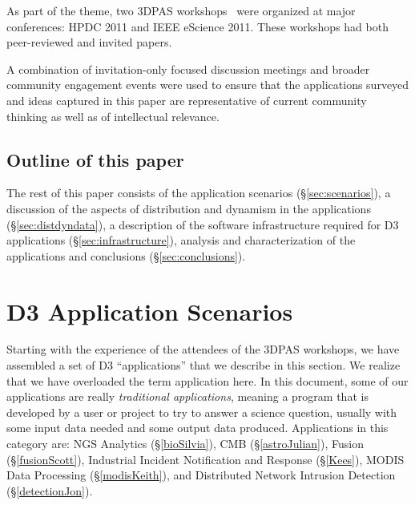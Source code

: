 As part of the theme, two 3DPAS workshops~\cite{3dapas,D3-escience}
were organized at major conferences: HPDC 2011 and IEEE eScience 2011.
These workshops had both peer-reviewed and invited papers.

A combination of invitation-only focused discussion meetings and
broader community engagement events were used to ensure that the
applications surveyed and ideas captured in this paper are
representative of current community thinking as well as of
intellectual relevance.


\subsection{Outline of this paper}

The rest of this paper consists of
the application scenarios (\S\ref{sec:scenarios}),
a discussion of the aspects of distribution and dynamism in the
applications (\S\ref{sec:distdyndata}),
a description of the software infrastructure required for D3 applications
(\S\ref{sec:infrastructure}),
analysis and characterization of the applications and
conclusions (\S\ref{sec:conclusions}).

\section{D3 Application Scenarios \label{sec:scenarios}}

Starting with the experience of the attendees of the 3DPAS workshops,
we have assembled a set of D3 ``applications'' that we describe in
this section.  We realize that we have overloaded the term application
here.  In this document, some of our applications are really {\em
  traditional applications}, meaning a program that is developed by a
user or project to try to answer a science question, usually with some
input data needed and some output data produced.  Applications in this
category are: NGS Analytics (\S\ref{bioSilvia}), CMB
(\S\ref{astroJulian}), Fusion (\S\ref{fusionScott}), Industrial
Incident Notification and Response (\S\ref{Kees}), MODIS Data
Processing (\S\ref{modisKeith}), and Distributed Network Intrusion
Detection (\S\ref{detectionJon}).

